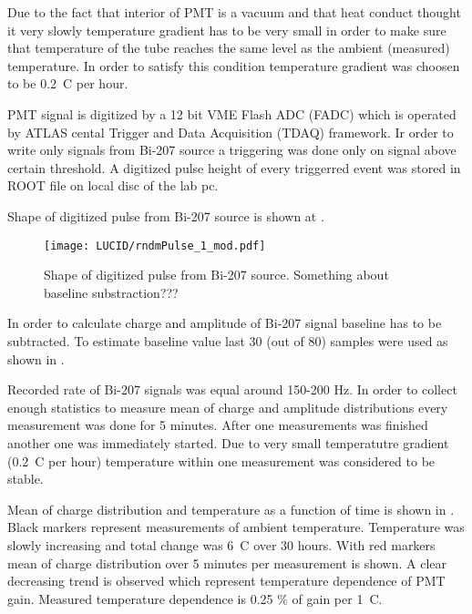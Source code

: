 Due to the fact that interior of PMT is a vacuum and that heat conduct thought it very slowly temperature gradient has to be very small in order to make sure 
that temperature of the tube reaches the same level as the ambient (measured) temperature.
In order to satisfy this condition temperature gradient was choosen to be 0.2\degree~C per hour.

PMT signal is digitized by a 12 bit VME Flash ADC (FADC) which is operated by ATLAS cental Trigger and Data Acquisition (TDAQ) framework.
Ir order to write only signals from Bi-207 source a triggering was done only on signal above certain threshold.
A digitized pulse height of every triggerred event was stored in ROOT file on local disc of the lab pc.

Shape of digitized pulse from Bi-207 source is shown at . 

\begin{figure}
\centering
\texttt{[image: LUCID/rndmPulse\_1\_mod.pdf]}
\caption{Shape of digitized pulse from Bi-207 source. Something about baseline substraction??? }
\label{fig:bi207DigitizedPulse}
\end{figure}

In order to calculate charge and amplitude of Bi-207 signal baseline has to be subtracted. 
To estimate baseline value last 30 (out of 80) samples were used as shown in .

Recorded rate of Bi-207 signals was equal around 150-200 Hz. In order to collect enough statistics to measure mean of charge and amplitude distributions
every measurement was done for 5 minutes. After one measurements was finished another one was immediately started.
Due to very small temperatutre gradient (0.2\degree~C per hour) temperature within one measurement was considered to be stable.

Mean of charge distribution and temperature as a function of time is shown in .
Black markers represent measurements of ambient temperature. Temperature was slowly increasing and total change was 6\degree~C over 30 hours.
With red markers mean of charge distribution over 5 minutes per measurement is shown.
A clear decreasing trend is observed which represent temperature dependence of PMT gain.
Measured temperature dependence is 0.25 $\%$ of gain per 1\degree~C. 




